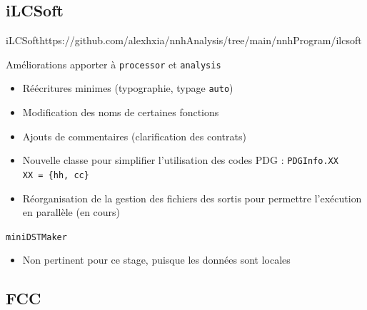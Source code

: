\documentclass[9pt]{beamer}
\begin{document}
\subsection{iLCSoft}

\begin{frame}{iLCSoft}{https://github.com/alexhxia/nnhAnalysis/tree/main/nnhProgram/ilcsoft}

	\begin{block}{Améliorations apporter à \texttt{processor} et \texttt{analysis}}
		\begin{itemize}
			\item Réécritures minimes (typographie, typage \texttt{auto})
			\item Modification des noms de certaines fonctions
			\item Ajouts de commentaires (clarification des contrats)
			\item Nouvelle classe pour simplifier l'utilisation des codes PDG : \texttt{PDGInfo.XX}\\
					\texttt{XX = \{hh, cc\}}
			\item Réorganisation de la gestion des fichiers des sortis pour permettre l'exécution en parallèle (en cours)
		\end{itemize}
	\end{block}
	
	\begin{block}{\texttt{miniDSTMaker}}
		\begin{itemize}
			\item Non pertinent pour ce stage, puisque les données sont locales
		\end{itemize}
	\end{block}

\end{frame}

\subsection{FCC}
\end{document}
